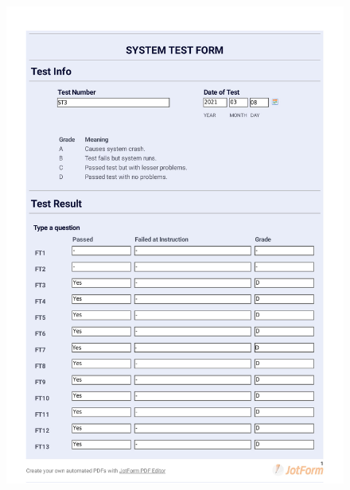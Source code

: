 \documentclass{article}
\begin{document}
 \begin{figure}
     \centering
     \includegraphics[width=13cm]{images/2021-03-08_Anas_ST3-1}
     \renewcommand\figurename{Figure}
     \label{fig:my_label}
 \end{figure}
 
\end{document}
